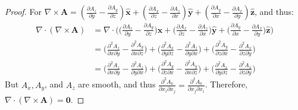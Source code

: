            \begin{proof}
            For $\nabla \times \mathbf{A} = (\frac{\partial A_{z}}{\partial y} - \frac{\partial A_{y}}{\partial z})\hat{\mathbf{x}}+(\frac{\partial A_{x}}{\partial z} - \frac{\partial A_{z}}{\partial x})\hat{\mathbf{y}}+(\frac{\partial A_{y}}{\partial x} - \frac{\partial A_{x}}{\partial y})\hat{\mathbf{z}}$, and thus:
            \begin{align*}
                \nabla \cdot (\nabla \times \mathbf{A}) &=\nabla \cdot \bigg(\big(\frac{\partial A_{z}}{\partial y} - \frac{\partial A_{y}}{\partial z}\big)\hat{\mathbf{x}}+\big(\frac{\partial A_{x}}{\partial z} - \frac{\partial A_{z}}{\partial x}\big)\hat{\mathbf{y}}+\big(\frac{\partial A_{y}}{\partial x} - \frac{\partial A_{x}}{\partial y}\big)\hat{\mathbf{z}}\bigg)\\
                &=\bigg(\frac{\partial^{2}A_{z}}{\partial x \partial y} - \frac{\partial^{2}A_{y}}{\partial x \partial z}\bigg)+\bigg(\frac{\partial^{2}A_{x}}{\partial y \partial z} - \frac{\partial^{2}A_{z}}{\partial y \partial x}\bigg) + \bigg(\frac{\partial^{2} A_{y}}{\partial z \partial x} - \frac{\partial^{2} A_{x}}{\partial z \partial y}\bigg)\\
                &= \bigg(\frac{\partial^{2} A_{z}}{\partial x \partial y} - \frac{\partial^{2} A_{z}}{\partial y \partial x}\bigg) + \bigg(\frac{\partial^{2} A_{y}}{\partial z \partial x} - \frac{\partial^{2} A_{y}}{\partial x \partial z}\bigg) + \bigg(\frac{\partial^{2}A_{x}}{\partial y \partial z} - \frac{\partial^{2} A_{x}}{\partial z \partial y}\bigg)
            \end{align*}
            But $A_{x},A_{y}$, and $A_{z}$ are smooth, and thus $\frac{\partial^{2} A_{k}}{\partial x_{i} \partial x_{j}} = \frac{\partial^{2} A_{k}}{\partial x_{j} \partial x_{i}}$. Therefore, $\nabla \cdot (\nabla \times \mathbf{A}) = \boldsymbol{0}$.
            \end{proof}